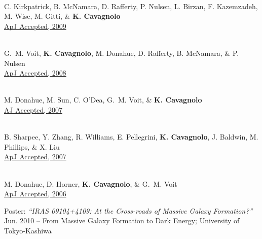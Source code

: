 \documentclass[11pt]{cv}
\begin{document}
\begin{llist}
{}\\
C. Kirkpatrick, B. McNamara, D. Rafferty, P. Nulsen, L. Birzan, F. Kazemzadeh, M. Wise, M. Gitti, \& {\bf K. Cavagnolo}\\
\href{http://adsabs.harvard.edu/abs/2009ApJ...697..867K}{ApJ Accepted, 2009}

{}\\
G.~M. Voit, {\bf K. Cavagnolo}, M. Donahue, D. Rafferty, B. McNamara, \& P. Nulsen\\
\href{http://adsabs.harvard.edu/abs/2008ApJ...681L...5V}{ApJ Accepted, 2008}

{}\\
M. Donahue, M. Sun, C. O'Dea, G.~M. Voit, \& {\bf K. Cavagnolo}\\
\href{http://adsabs.harvard.edu/abs/2007AJ....134...14D}{AJ Accepted, 2007}

{}\\
B. Sharpee, Y. Zhang, R. Williams, E. Pellegrini, {\bf K. Cavagnolo}, J. Baldwin, M. Phillips, \& X. Liu\\
\href{http://adsabs.harvard.edu/abs/2007ApJ...659.1265S}{ApJ Accepted, 2007}

{}\\
M. Donahue, D. Horner, {\bf K. Cavagnolo}, \& G.~M. Voit\\
\href{http://adsabs.harvard.edu/abs/2006ApJ...643..730D}{ApJ Accepted, 2006}




{\sc Poster: {\textit{``IRAS 09104+4109: At the Cross-roads of Massive Galaxy Formation?''}}}\\
Jun. 2010 -- From Massive Galaxy Formation to Dark Energy; University of Tokyo-Kashiwa


\end{llist}
\end{document}

